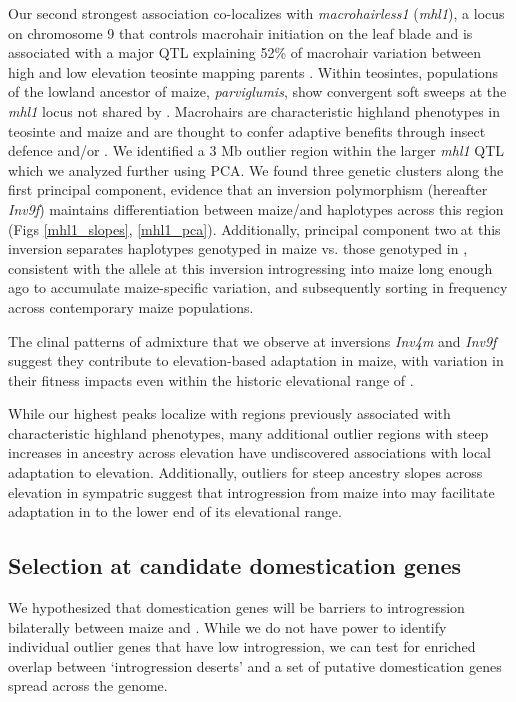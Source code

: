 Our second strongest association co-localizes with \textit{macrohairless1} (\textit{mhl1}), a locus on chromosome 9 that controls macrohair initiation on the leaf blade \cite{Moose_Lauter_Carlson:2004_mhl1} and is associated with a major QTL explaining 52\% of macrohair variation between high and low elevation teosinte mapping parents \cite{Lauter:2004}.  
Within teosintes, populations of the lowland ancestor of maize, \textit{parviglumis}, show convergent soft sweeps at the \textit{mhl1} locus not shared by \mexicana \cite{Fustier:2017}. Macrohairs are characteristic highland phenotypes in teosinte and maize and are thought to confer adaptive benefits through insect defence and/or  \cite{Moya-Raygoza:2016, Lauter:2004}. We identified a 3 Mb outlier region within the larger \textit{mhl1} QTL which we analyzed further using PCA. 
We found three genetic clusters along the first principal component, evidence that an inversion polymorphism (hereafter \textit{Inv9f}) maintains differentiation between maize/\parviglumis and \mexicana haplotypes across this region (Figs \ref{mhl1_slopes}, \ref{mhl1_pca}).
Additionally, principal component two at this inversion separates haplotypes genotyped in maize vs. those genotyped in \mexicana, consistent with the \mexicana allele at this inversion introgressing into maize long enough ago to accumulate maize-specific variation, and subsequently sorting in frequency across contemporary maize populations.

The clinal patterns of admixture that we observe at inversions \textit{Inv4m} and \textit{Inv9f} suggest they contribute to elevation-based adaptation in maize, with variation in their fitness impacts even within the historic elevational range of \mexicana.

While our highest peaks localize
with regions previously associated with characteristic highland phenotypes, many additional outlier regions with steep increases in \mexicana ancestry across elevation have undiscovered associations with local adaptation to elevation. 
Additionally, outliers for steep ancestry slopes across elevation in sympatric \mexicana suggest that introgression from maize into \mexicana may facilitate adaptation in \mexicana to the lower end of its elevational range.

\subsection*{Selection at candidate domestication genes}
We hypothesized that domestication genes will be barriers to introgression bilaterally between maize and \mexicana \cite{Hufford:2013_crop_wild}.
While we do not have power to identify individual outlier genes that have low introgression, we can test for enriched overlap between ‘introgression deserts' and a set of putative domestication genes spread across the genome. 

